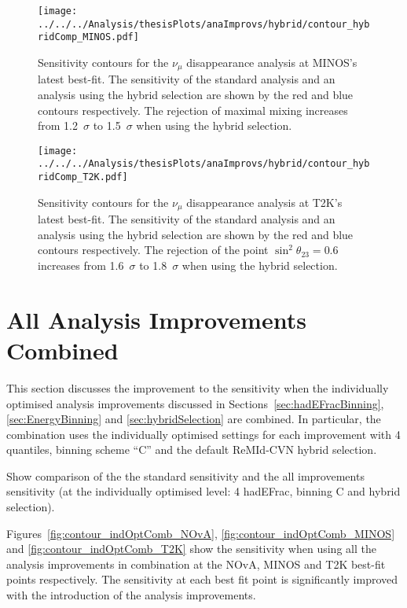 \begin{figure}
  \centering
\texttt{[image: ../../../Analysis/thesisPlots/anaImprovs/hybrid/contour\_hybridComp\_MINOS.pdf]}
  \caption{
    Sensitivity contours for the $\nu_\mu$ disappearance analysis at
    MINOS's latest best-fit. The sensitivity of the standard analysis
    and an analysis using the hybrid selection are shown by the red
    and blue contours respectively.
    The rejection of maximal mixing increases from 1.2~$\sigma$ to
    1.5~$\sigma$ when using the hybrid selection. 
  } 
  \label{fig:contour_hybrid_MINOS}
\end{figure}

\begin{figure}
  \centering
\texttt{[image: ../../../Analysis/thesisPlots/anaImprovs/hybrid/contour\_hybridComp\_T2K.pdf]}
  \caption{
    Sensitivity contours for the $\nu_\mu$ disappearance analysis at
    T2K's latest best-fit. The sensitivity of the standard analysis
    and an analysis using the hybrid selection are shown by the red
    and blue contours respectively.
    The rejection of the point $\sin^2\theta_{23} = 0.6$
    increases from 1.6~$\sigma$ to 1.8~$\sigma$ when using the hybrid
    selection. 
  } 
  \label{fig:contour_hybrid_T2K}
\end{figure}




\section{All Analysis Improvements Combined} \label{sec:Allimprovs}

This section discusses the improvement to the sensitivity when the
individually optimised analysis improvements discussed in 
Sections~\ref{sec:hadEFracBinning}, \ref{sec:EnergyBinning} and
\ref{sec:hybridSelection} are combined. 
In particular, the combination uses the individually optimised
settings for each improvement with 4 \hadefrac{} quantiles, binning
scheme ``C'' and the default ReMId-CVN hybrid selection.

Show comparison of the the standard sensitivity and the all
improvements sensitivity (at the individually optimised level: 4
hadEFrac, binning C and hybrid selection).

Figures~\ref{fig:contour_indOptComb_NOvA},
\ref{fig:contour_indOptComb_MINOS} and
\ref{fig:contour_indOptComb_T2K} show the sensitivity when using all
the analysis improvements in combination at the NOvA, MINOS and T2K
best-fit points respectively. The sensitivity at each best fit point
is significantly improved with the introduction of the analysis
improvements. 


